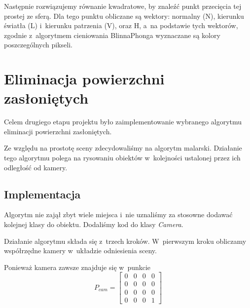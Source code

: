 \documentclass[a4paper]{article}
\begin{document}
{Następnie rozwiązujemy równanie kwadratowe, by znaleźć punkt przecięcia tej prostej ze sferą.
Dla tego punktu obliczane są wektory: normalny (N), kierunku światła (L) i~kierunku patrzenia (V), oraz H, a~na podstawie tych wektorów, zgodnie z~algorytmem cieniowania Blinna\dywiz Phonga wyznaczane są kolory poszczególnych pikseli.

\section{Eliminacja powierzchni zasłoniętych}
Celem drugiego etapu projektu było zaimplementowanie wybranego algorytmu eliminacji powierzchni zasłoniętych.

Ze względu na prostotę sceny zdecydowaliśmy na algorytm malarski.
Działanie tego algorytmu polega na rysowaniu obiektów w~kolejności ustalonej przez ich odległość od kamery.

\subsection{Implementacja}
Algorytm nie zajął zbyt wiele miejsca i~nie uznaliśmy za stosowne dodawać kolejnej klasy do obiektu.
Dodaliśmy kod do klasy \emph{Camera}.

Działanie algorytmu składa się z~trzech kroków.
W~pierwszym kroku obliczamy współrzędne kamery w~układzie odniesienia sceny.

Ponieważ kamera zawsze znajduje się w~punkcie
\[
P_{cam} = 
\begin{bmatrix}
  0 & 0 & 0 & 0 \\
  0 & 0 & 0 & 0 \\
  0 & 0 & 0 & 0 \\
  0 & 0 & 0 & 1
\end{bmatrix}
\]

}
\end{document}
